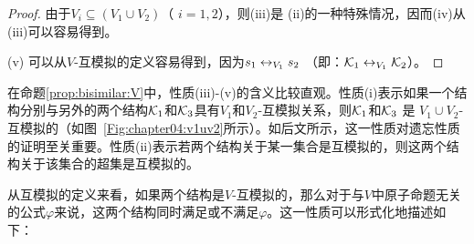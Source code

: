 \begin{proof}
	由于$V_i \subseteq (V_1 \cup V_2)$（ $i = 1, 2$），则(iii)是 (ii)的一种特殊情况，因而(iv)从(iii)可以容易得到。
	
	(v) 可以从$V$-互模拟的定义容易得到，因为$s_1 \leftrightarrow_{V_1} s_2$ （即：${\cal K}_1\leftrightarrow_{V_1}{\cal K}_2$）。	
\end{proof}


在命题\ref{prop:bisimilar:V}中，性质(iii)-(v)的含义比较直观。性质(i)表示如果一个结构分别与另外的两个结构${\cal K}_1$和${\cal K}_3$具有$V_1$和$V_2$-互模拟关系，则${\cal K}_1$和${\cal K}_3$ 是 $V_1\cup V_2$-互模拟的（如图~\ref{Fig:chapter04:v1uv2}所示）。如后文所示，这一性质对遗忘性质的证明至关重要。性质(ii)表示若两个结构关于某一集合是互模拟的，则这两个结构关于该集合的超集是互模拟的。

从互模拟的定义来看，如果两个结构是$V$-互模拟的，那么对于与$V$中原子命题无关的公式$\varphi$来说，这两个结构同时满足或不满足$\varphi$。这一性质可以形式化地描述如下：


